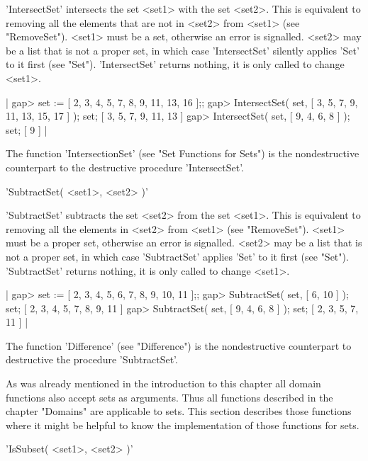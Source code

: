 'IntersectSet' intersects  the set <set1> with the  set <set2>.  This  is
equivalent  to removing all  the elements  that are not  in  <set2>  from
<set1> (see  "RemoveSet").  <set1> must be a  set, otherwise  an error is
signalled.  <set2> may be a list that is not a proper  set, in which case
'IntersectSet'   silently  applies  'Set' to      it first  (see  "Set").
'IntersectSet' returns nothing, it is only called to change <set1>.

|    gap> set := [ 2, 3, 4, 5, 7, 8, 9, 11, 13, 16 ];;
    gap> IntersectSet( set, [ 3, 5, 7, 9, 11, 13, 15, 17 ] );  set;
    [ 3, 5, 7, 9, 11, 13 ]
    gap> IntersectSet( set, [ 9, 4, 6, 8 ] );  set;
    [ 9 ] |

The function 'IntersectionSet'  (see  "Set Functions  for Sets")  is  the
nondestructive counterpart to the destructive procedure 'IntersectSet'.

%

'SubtractSet( <set1>, <set2> )'

'SubtractSet'  subtracts  the set  <set2>  from the set  <set1>.  This is
equivalent to  removing  all the elements in   <set2>  from  <set1>  (see
"RemoveSet").   <set1> must  be  a  proper  set, otherwise   an  error is
signalled.  <set2> may be a list that is not a proper  set, in which case
'SubtractSet' applies  'Set'   to it   first  (see "Set").  'SubtractSet'
returns nothing, it is only called to change <set1>.

|    gap> set := [ 2, 3, 4, 5, 6, 7, 8, 9, 10, 11 ];;
    gap> SubtractSet( set, [ 6, 10 ] );  set;
    [ 2, 3, 4, 5, 7, 8, 9, 11 ]
    gap> SubtractSet( set, [ 9, 4, 6, 8 ] );  set;
    [ 2, 3, 5, 7, 11 ] |

The function 'Difference'   (see  "Difference")  is   the  nondestructive
counterpart to destructive the procedure 'SubtractSet'.

%

As was already mentioned  in  the introduction to this chapter all domain
functions also accept sets as arguments.  Thus all functions described in
the chapter "Domains"  are applicable to sets.   This  section  describes
those functions where  it might be helpful to know  the implementation of
those functions for sets.

'IsSubset( <set1>, <set2> )'%

